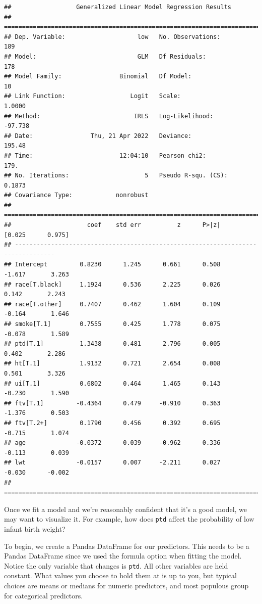 \documentclass[
]{book}
\begin{document}
\begin{verbatim}
##                  Generalized Linear Model Regression Results                  
## ==============================================================================
## Dep. Variable:                    low   No. Observations:                  189
## Model:                            GLM   Df Residuals:                      178
## Model Family:                Binomial   Df Model:                           10
## Link Function:                  Logit   Scale:                          1.0000
## Method:                          IRLS   Log-Likelihood:                -97.738
## Date:                Thu, 21 Apr 2022   Deviance:                       195.48
## Time:                        12:04:10   Pearson chi2:                     179.
## No. Iterations:                     5   Pseudo R-squ. (CS):             0.1873
## Covariance Type:            nonrobust                                         
## =================================================================================
##                     coef    std err          z      P>|z|      [0.025      0.975]
## ---------------------------------------------------------------------------------
## Intercept         0.8230      1.245      0.661      0.508      -1.617       3.263
## race[T.black]     1.1924      0.536      2.225      0.026       0.142       2.243
## race[T.other]     0.7407      0.462      1.604      0.109      -0.164       1.646
## smoke[T.1]        0.7555      0.425      1.778      0.075      -0.078       1.589
## ptd[T.1]          1.3438      0.481      2.796      0.005       0.402       2.286
## ht[T.1]           1.9132      0.721      2.654      0.008       0.501       3.326
## ui[T.1]           0.6802      0.464      1.465      0.143      -0.230       1.590
## ftv[T.1]         -0.4364      0.479     -0.910      0.363      -1.376       0.503
## ftv[T.2+]         0.1790      0.456      0.392      0.695      -0.715       1.074
## age              -0.0372      0.039     -0.962      0.336      -0.113       0.039
## lwt              -0.0157      0.007     -2.211      0.027      -0.030      -0.002
## =================================================================================
\end{verbatim}

Once we fit a model and we're reasonably confident that it's a good model, we may want to visualize it. For example, how does \texttt{ptd} affect the probability of low infant birth weight?

To begin, we create a Pandas DataFrame for our predictors. This needs to be a Pandas DataFrame since we used the formula option when fitting the model. Notice the only variable that changes is \texttt{ptd}. All other variables are held constant. What values you choose to hold them at is up to you, but typical choices are means or medians for numeric predictors, and most populous group for categorical predictors.
\end{document}
